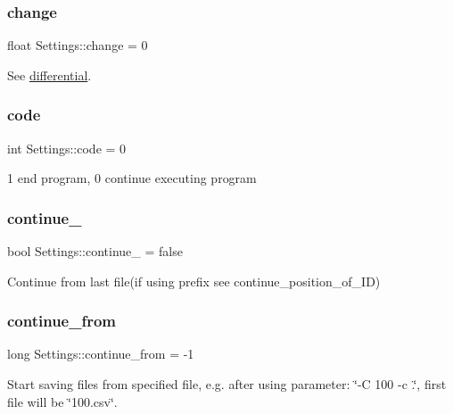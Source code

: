 \subsubsection{\texorpdfstring{change}{change}}
{\footnotesize\ttfamily float Settings\+::change = 0}



See \hyperlink{class_settings_a107556b8673e33e63d1310a73ed4aee7}{differential}. 

\mbox{\label{class_settings_a059440ec7c5feac6874fa8836a825da5}} 
\subsubsection{\texorpdfstring{code}{code}}
{\footnotesize\ttfamily int Settings\+::code = 0}



1 end program, 0 continue executing program 

\mbox{\label{class_settings_a9ba1ae6d93fad667c597fff4e723025b}} 
\subsubsection{\texorpdfstring{continue\+\_\+}{continue\_}}
{\footnotesize\ttfamily bool Settings\+::continue\+\_\+ = false}



Continue from last file(if using prefix see continue\+\_\+position\+\_\+of\+\_\+\+I\+D) 

\mbox{\label{class_settings_a1ff22226652e146e1511d9d17deefa1f}} 
\subsubsection{\texorpdfstring{continue\+\_\+from}{continue\_from}}
{\footnotesize\ttfamily long Settings\+::continue\+\_\+from = -\/1}



Start saving files from specified file, e.\+g. after using parameter\+: \char`\"{}-\/\+C 100 -\/c .\char`\"{}, first file will be \char`\"{}100.\+csv\char`\"{}. 


